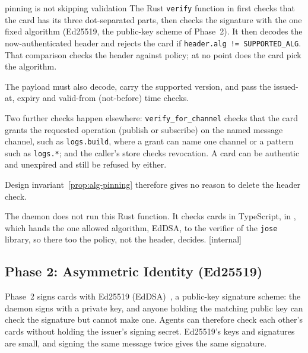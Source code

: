 \documentclass[11pt,a4paper]{article}
\theoremstyle{definition}
\begin{document}
\begin{pdexample}{pinning is not skipping validation}
\setlength{\parskip}{4pt plus 1pt}
The Rust \texttt{verify} function in  first checks that the card has its
three dot-separated parts, then checks the signature with the one fixed
algorithm (Ed25519, the public-key scheme of Phase~2). It then decodes the
now-authenticated header and rejects the card if
\texttt{header.alg != SUPPORTED\_ALG}. That comparison checks the header
against policy; at no point does the card pick the algorithm.

The payload must also decode, carry the supported version, and pass the
issued-at, expiry and valid-from (not-before) time checks.

Two further checks happen elsewhere: \texttt{verify\_for\_channel} checks that
the card grants the requested operation (publish or subscribe) on the named
message channel, such as \texttt{logs.build}, where a grant can name one channel
or a pattern such as \texttt{logs.*}; and the caller's store checks revocation.
A card can be authentic and unexpired and still be refused by either.

Design invariant~\ref{prop:alg-pinning} therefore gives no reason to delete
the header check.

The daemon does not run this Rust function. It checks cards in TypeScript, in
, which hands the one allowed algorithm, EdDSA, to
the verifier of the \texttt{jose} library, so there too the policy, not the
header, decides.
[internal]
\end{pdexample}

\subsection{Phase 2: Asymmetric Identity (Ed25519)}

Phase~2 signs cards with Ed25519 (EdDSA)~, a public-key signature scheme: the daemon signs with a private key, and anyone holding the matching public key can check the signature but cannot make one. Agents can therefore check each other's cards without holding the issuer's signing secret. Ed25519's keys and signatures are small, and signing the same message twice gives the same signature.
\end{document}
